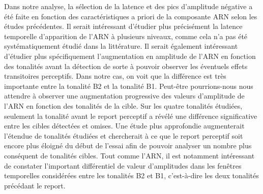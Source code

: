 Dans notre analyse, la sélection de la latence et des pics d'amplitude négative a été faite en fonction des caractéristiques a priori de la composante ARN selon les études précédentes. 
Il serait intéressant d'étudier plus précisément la latence temporelle d'apparition de l'ARN à plusieurs niveaux, comme cela n'a pas été systématiquement étudié dans la littérature. 
Il serait également intéressant d'étudier plus spécifiquement l'augmentation en amplitude de l'ARN en fonction des tonalités avant la détection de sorte à pouvoir observer les éventuels effets transitoires perceptifs. 
Dans notre cas, on voit que la différence est très importante entre la tonalité B2 et la tonalité B1. 
Peut-être pourrions-nous nous attendre à observer une augmentation progressive des valeurs d'amplitude de l'ARN en fonction des tonalités de la cible. 
Sur les quatre tonalités étudiées, seulement la tonalité avant le report perceptif a révélé une différence significative entre les cibles détectées et omises. 
Une étude plus approfondie augmenterait l'étendue de tonalités étudiées et chercherait à ce que le report perceptif soit encore plus éloigné du début de l'essai afin de pouvoir analyser un nombre plus conséquent de tonalités cibles. 
Tout comme l'ARN, il est notamment intéressant de constater l'important différentiel de valeur d'amplitudes dans les fenêtres temporelles considérées entre les tonalités B2 et B1, c'est-à-dire les deux tonalités précédant le report. 

